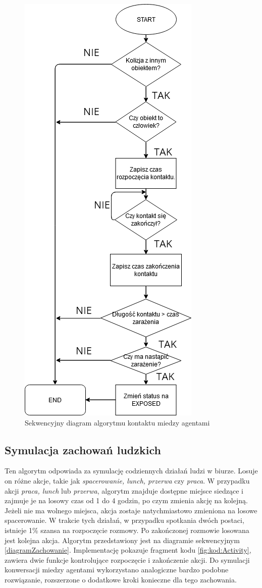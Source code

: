 \begin{figure}[h!]
	\centering
	\includegraphics[width=0.6\linewidth]{DiagramKontaktu.png}
	\caption{Sekwencyjny diagram algorytmu kontaktu miedzy agentami}
	\label{diagramZarazanie}
\end{figure}

\subsection{Symulacja zachowań ludzkich}
Ten algorytm odpowiada za symulację codziennych działań ludzi w biurze. Losuje on różne akcje, takie jak \textit{spacerowanie, lunch, przerwa} czy \textit{praca}. W przypadku akcji \textit{praca, lunch} lub \textit{przerwa}, algorytm znajduje dostępne miejsce siedzące i zajmuje je na losowy czas od 1 do 4 godzin, po czym zmienia akcję na kolejną. Jeżeli nie ma wolnego miejsca, akcja zostaje natychmiastowo zmieniona na losowe spacerowanie. W trakcie tych działań, w przypadku spotkania dwóch postaci, istnieje 1\% szansa na rozpoczęcie rozmowy. Po zakończonej rozmowie losowana jest kolejna akcja. Algorytm przedstawiony jest na diagramie sekwencyjnym \ref{diagramZachowanie}. Implementację pokazuje fragment kodu \ref{fig:kod:Activity}, zawiera dwie funkcje kontrolujące rozpoczęcie i zakończenie akcji. Do symulacji konwersacji miedzy agentami wykorzystano analogiczne bardzo podobne rozwiązanie, rozszerzone o dodatkowe kroki konieczne dla tego zachowania.

